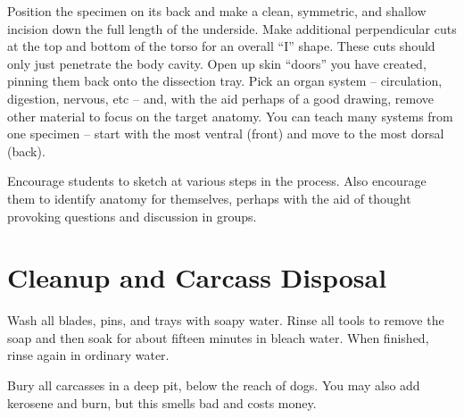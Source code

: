 Position the specimen on its back and make a clean, symmetric, and shallow incision down the full length of the underside. Make additional perpendicular cuts at the top and bottom of the torso for an overall “I” shape. These cuts should only just penetrate the body cavity. Open up skin “doors” you have created, pinning them back onto the dissection tray. Pick an organ system – circulation, digestion, nervous, etc – and, with the aid perhaps of a good drawing, remove other material to focus on the target anatomy. You can teach many systems from one specimen – start with the most ventral (front) and move to the most dorsal (back).

Encourage students to sketch at various steps in the process. Also encourage them to identify anatomy for themselves, perhaps with the aid of thought provoking questions and discussion in groups.

\section{Cleanup and Carcass Disposal}

Wash all blades, pins, and trays with soapy water. 
Rinse all tools to remove the soap 
and then soak for about fifteen minutes in bleach water. 
When finished, rinse again in ordinary water.

Bury all carcasses in a deep pit, below the reach of dogs. 
You may also add kerosene and burn, 
but this smells bad and costs money.
